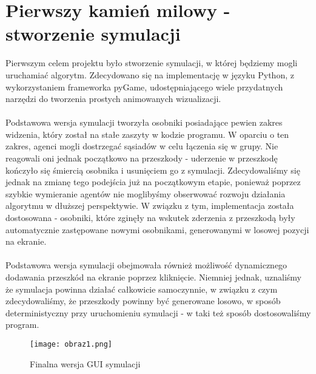 \documentclass[a4paper,12pt]{article}
\begin{document}
\section{Pierwszy kamień milowy - stworzenie symulacji}
Pierwszym celem projektu było stworzenie symulacji, w której będziemy mogli uruchamiać algorytm. Zdecydowano się na implementację w języku Python, z wykorzystaniem frameworka pyGame, udostępniającego wiele przydatnych narzędzi do tworzenia prostych animowanych wizualizacji.\\\\
Podstawowa wersja symulacji tworzyła osobniki posiadające pewien zakres widzenia, który został na stałe zaszyty w kodzie programu. W oparciu o ten zakres, agenci mogli dostrzegać sąsiadów w celu łączenia się w grupy. Nie reagowali oni jednak początkowo na przeszkody - uderzenie w przeszkodę kończyło się śmiercią osobnika i usunięciem go z symulacji. Zdecydowaliśmy się jednak na zmianę tego podejścia już na początkowym etapie, ponieważ poprzez szybkie wymieranie agentów nie moglibyśmy obserwować rozwoju działania algorytmu w dłuższej perspektywie. W związku z tym, implementacja została dostosowana - osobniki, które zginęły na wskutek zderzenia z przeszkodą były automatycznie zastępowane nowymi osobnikami, generowanymi w losowej pozycji na ekranie. 
\\\\Podstawowa wersja symulacji obejmowała również możliwość dynamicznego dodawania przeszkód na ekranie poprzez kliknięcie. Niemniej jednak, uznaliśmy że symulacja powinna działać całkowicie samoczynnie, w związku z czym zdecydowaliśmy, że przeszkody powinny być generowane losowo, w sposób deterministyczny przy uruchomieniu symulacji - w taki też sposób dostosowaliśmy program. 

\begin{figure}[H]
    \centering
    \texttt{[image: obraz1.png]}
    \caption{Finalna wersja GUI symulacji}
    \label{fig:enter-label}
\end{figure}
\end{document}

